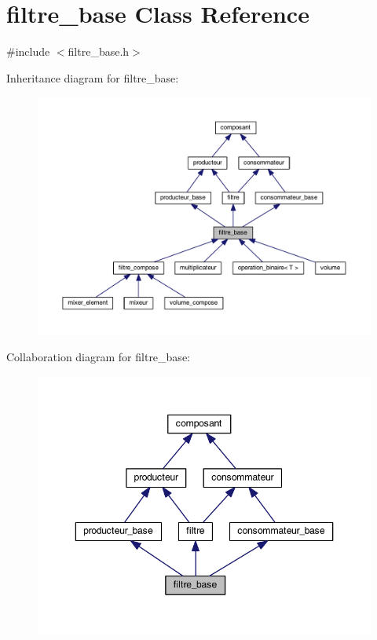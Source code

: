 \hypertarget{classfiltre__base}{\section{filtre\-\_\-base Class Reference}
\label{classfiltre__base}
}


{\ttfamily \#include $<$filtre\-\_\-base.\-h$>$}



Inheritance diagram for filtre\-\_\-base\-:
\nopagebreak
\begin{figure}[H]
\begin{center}
\leavevmode
\includegraphics[width=350pt]{classfiltre__base__inherit__graph}
\end{center}
\end{figure}


Collaboration diagram for filtre\-\_\-base\-:
\nopagebreak
\begin{figure}[H]
\begin{center}
\leavevmode
\includegraphics[width=346pt]{classfiltre__base__coll__graph}
\end{center}
\end{figure}

